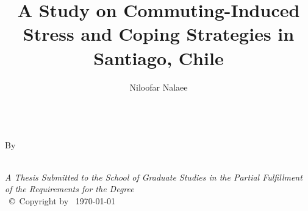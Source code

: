 \documentclass[
11pt, %
oneside, %
english, %
singlespacing, %
]{macthesis} %
\title{A Study on Commuting-Induced Stress and Coping Strategies in Santiago, Chile}
\author{Niloofar Nalaee}
\date{}
\begin{document}
\sloppy

\frontmatter %

\pagestyle{plain} %

\vspace{6cm}
\begin{center}
\ttitle
\end{center}
\clearpage

\begin{center}

\vfill
\textsc{\Large \ttitle}\\[1 cm]

By  \\[1 cm]
{\authorname\, \bdeg }


 \vfill
{\large \textit{A Thesis Submitted to the School of Graduate Studies in the Partial Fulfillment of the Requirements for the Degree \degreename}}\\

\vfill
{\large \univname\, \copyright\, Copyright by \authorname\, \today}\\[4cm] %

\end{center}
\clearpage
\end{document}

